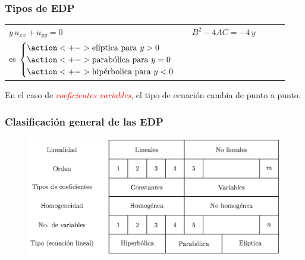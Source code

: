 \documentclass[12pt]{beamer}
\begin{document}
\begin{frame}
\frametitle{Tipos de EDP}
\begin{table}[H]
\centering
\begin{tabular}{l l l l l}    
\Large{$y \, u_{xx} + u_{yy} = 0$} & \large{$B^{2} {-} 4 A C {=} - 4 \, y$} & & & \\ \pause
es $\begin{cases}
    \action<+->{\mbox{elíptica para } y > 0} \\
    \action<+->{\mbox{parabólica para } y = 0} \\
    \action<+->{\mbox{hipérbolica para } y < 0} \\
    \end{cases}$ & & & & \\
\end{tabular}
\end{table}
\pause
En el caso de \emph{\textcolor{red}{coeficientes variables}}, el tipo de ecuación cambia de punto a punto.
\end{frame}


\begin{frame}
\frametitle{Clasificación general de las EDP}
\begin{figure}[H]
    \centering
    \includegraphics[scale=0.85]{Imagenes/Cuadro_Clasificacion_EDP.eps}
\end{figure}
\end{frame}
\end{document}
